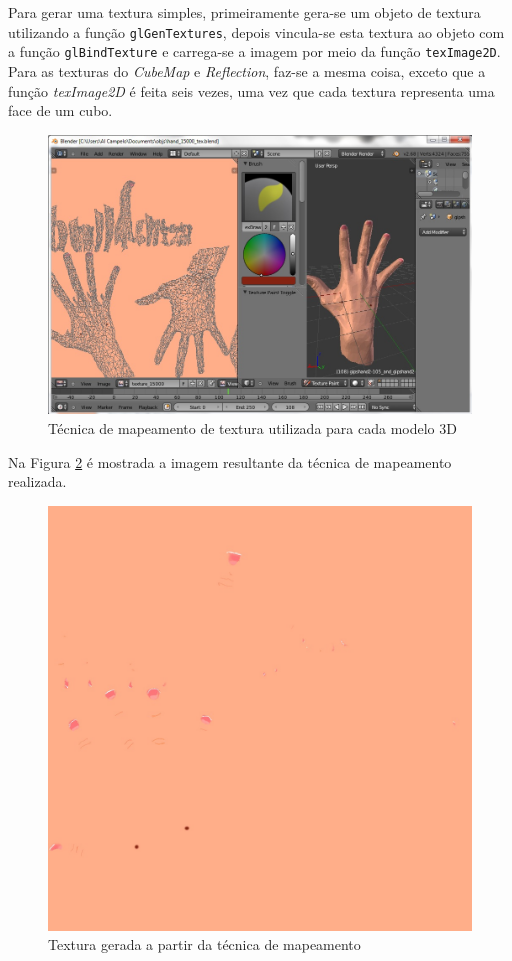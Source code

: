 	Para gerar uma textura simples, primeiramente gera-se um objeto de textura utilizando a função \texttt{glGenTextures}, depois vincula-se esta textura ao objeto com a função \texttt{glBindTexture} e carrega-se a imagem por meio da função \texttt{texImage2D}.  Para as texturas do \textit{CubeMap} e \textit{Reflection}, faz-se a mesma coisa, exceto que a função \textit{texImage2D} é feita seis vezes, uma vez que cada textura representa uma face de um cubo. 

	\begin{figure}[ht]
	\centering
		\includegraphics[keepaspectratio=true,scale=0.6]{figuras/uvmap.jpg}
	\caption{Técnica de mapeamento de textura utilizada para cada modelo 3D}
	\label{uvmap}
	\end{figure}

	Na Figura  \ref{texture_uvmap} é mostrada a imagem resultante da técnica de mapeamento realizada.

	\begin{figure}[ht]
	\centering
		\includegraphics[keepaspectratio=true,scale=0.2]{figuras/texture_uvmap.jpg}
	\caption{Textura gerada a partir da técnica de mapeamento}
	\label{texture_uvmap}
	\end{figure}

